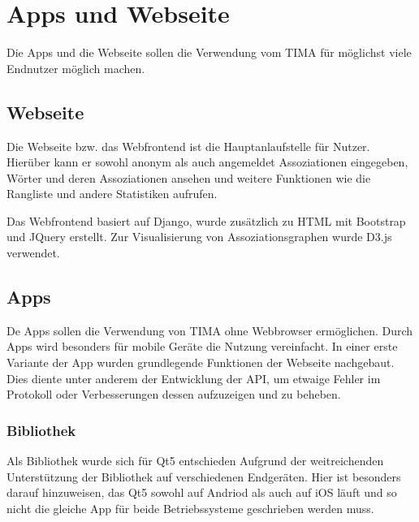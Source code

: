 \chapter{Apps und Webseite}
Die Apps und die Webseite sollen die Verwendung vom TIMA für möglichst
viele Endnutzer möglich machen.

\section{Webseite}
Die Webseite bzw. das Webfrontend ist die Hauptanlaufstelle für Nutzer. Hierüber kann er sowohl anonym als auch angemeldet Assoziationen eingegeben, Wörter und
deren Assoziationen ansehen und weitere Funktionen wie die Rangliste und andere Statistiken aufrufen.

Das Webfrontend basiert auf Django, wurde zusätzlich zu HTML mit Bootstrap und JQuery erstellt. Zur Visualisierung von Assoziationsgraphen wurde D3.js verwendet.

\section{Apps}
De Apps sollen die Verwendung von TIMA ohne Webbrowser ermöglichen. Durch Apps wird besonders für mobile Geräte die Nutzung vereinfacht.
In einer erste Variante der App wurden grundlegende Funktionen der
Webseite nachgebaut. Dies diente unter anderem der Entwicklung der API, um etwaige
Fehler im Protokoll oder Verbesserungen dessen aufzuzeigen und zu beheben.

\subsection{Bibliothek}
Als Bibliothek wurde sich für Qt5 entschieden Aufgrund der weitreichenden
Unterstützung der Bibliothek auf verschiedenen Endgeräten. Hier ist besonders darauf hinzuweisen, das Qt5 sowohl auf Andriod als auch auf iOS läuft und so nicht die gleiche App für beide Betriebssysteme geschrieben werden muss.

